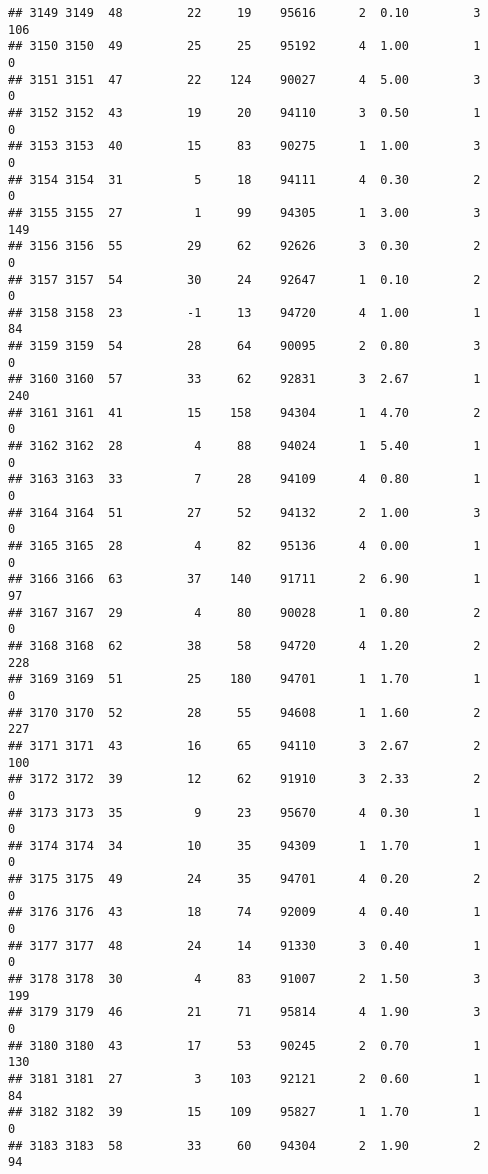 \documentclass[
]{article}
\begin{document}
\begin{verbatim}
## 3149 3149  48         22     19    95616      2  0.10         3      106
## 3150 3150  49         25     25    95192      4  1.00         1        0
## 3151 3151  47         22    124    90027      4  5.00         3        0
## 3152 3152  43         19     20    94110      3  0.50         1        0
## 3153 3153  40         15     83    90275      1  1.00         3        0
## 3154 3154  31          5     18    94111      4  0.30         2        0
## 3155 3155  27          1     99    94305      1  3.00         3      149
## 3156 3156  55         29     62    92626      3  0.30         2        0
## 3157 3157  54         30     24    92647      1  0.10         2        0
## 3158 3158  23         -1     13    94720      4  1.00         1       84
## 3159 3159  54         28     64    90095      2  0.80         3        0
## 3160 3160  57         33     62    92831      3  2.67         1      240
## 3161 3161  41         15    158    94304      1  4.70         2        0
## 3162 3162  28          4     88    94024      1  5.40         1        0
## 3163 3163  33          7     28    94109      4  0.80         1        0
## 3164 3164  51         27     52    94132      2  1.00         3        0
## 3165 3165  28          4     82    95136      4  0.00         1        0
## 3166 3166  63         37    140    91711      2  6.90         1       97
## 3167 3167  29          4     80    90028      1  0.80         2        0
## 3168 3168  62         38     58    94720      4  1.20         2      228
## 3169 3169  51         25    180    94701      1  1.70         1        0
## 3170 3170  52         28     55    94608      1  1.60         2      227
## 3171 3171  43         16     65    94110      3  2.67         2      100
## 3172 3172  39         12     62    91910      3  2.33         2        0
## 3173 3173  35          9     23    95670      4  0.30         1        0
## 3174 3174  34         10     35    94309      1  1.70         1        0
## 3175 3175  49         24     35    94701      4  0.20         2        0
## 3176 3176  43         18     74    92009      4  0.40         1        0
## 3177 3177  48         24     14    91330      3  0.40         1        0
## 3178 3178  30          4     83    91007      2  1.50         3      199
## 3179 3179  46         21     71    95814      4  1.90         3        0
## 3180 3180  43         17     53    90245      2  0.70         1      130
## 3181 3181  27          3    103    92121      2  0.60         1       84
## 3182 3182  39         15    109    95827      1  1.70         1        0
## 3183 3183  58         33     60    94304      2  1.90         2       94

\end{verbatim}
\end{document}
